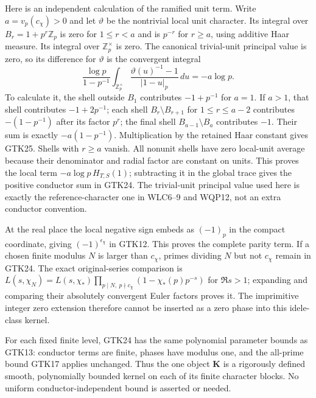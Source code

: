Here is an independent calculation of the ramified unit
term. Write $a=v_p(c_\chi)>0$ and let $\vartheta$ be the
nontrivial local unit character. Its integral over
$B_r=1+p^r\mathbb Z_p$ is zero for $1\le r<a$ and is
$p^{-r}$ for $r\ge a$, using additive Haar measure.
Its integral over $\mathbb Z_p^\times$ is zero. The
canonical trivial-unit principal value is zero, so its
difference for $\vartheta$ is the convergent integral
\begin{equation}\tag{GTK25}
 \frac{\log p}{1-p^{-1}}
 \int_{\mathbb Z_p^\times}
         \frac{\vartheta(u)^{-1}-1}{|1-u|_p}\,du
                   =-a\log p .
\end{equation}
To calculate it, the shell outside $B_1$ contributes
$-1+p^{-1}$ for $a=1$. If $a>1$, that shell contributes
$-1+2p^{-1}$; each shell $B_r\setminus B_{r+1}$ for
$1\le r\le a-2$ contributes $-(1-p^{-1})$ after its
factor $p^r$; the final shell $B_{a-1}\setminus B_a$
contributes $-1$. Their sum is exactly
$-a(1-p^{-1})$. Multiplication by the retained Haar
constant gives GTK25. Shells with $r\ge a$ vanish.
All nonunit shells have zero local-unit average because
their denominator and radial factor are constant on
units. This proves the local term $-a\log p\,H_{T,S}(1)$;
subtracting it in the global trace gives the positive
conductor sum in GTK24.
The trivial-unit principal value used here is exactly
the reference-character one in WLC6--9 and WQP12, not
an extra conductor convention.

At the real place the local negative sign embeds as
$(-1)_p$ in the compact coordinate, giving
$(-1)^{\epsilon_\chi}$ in GTK12. This proves the complete
parity term. If a chosen finite modulus $N$ is larger
than $c_\chi$, primes dividing $N$ but not $c_\chi$
remain in GTK24. The exact original-series comparison is
$L(s,\chi_N)=L(s,\chi_*)\prod_{p\mid N,\ p\nmid c_\chi}
(1-\chi_*(p)p^{-s})$ for $\Re s>1$; expanding and comparing
their absolutely convergent Euler factors proves it.
The imprimitive integer zero extension therefore cannot
be inserted as a zero phase into this idele-class kernel.

For each fixed finite level, GTK24 has the same
polynomial parameter bounds as GTK13: conductor terms
are finite, phases have modulus one, and the all-prime
bound GTK17 applies unchanged. Thus the one object
$\mathbf K$ is a rigorously defined smooth,
polynomially bounded kernel on each of its finite
character blocks. No uniform conductor-independent
bound is asserted or needed.

